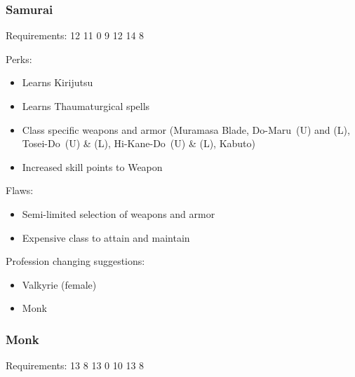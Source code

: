 \documentclass[12pt]{article}
\providecommand{\tightlist}{%
  \setlength{\itemsep}{0pt}\setlength{\parskip}{0pt}}
\newcommand{\WviiTwoColumnSetup}{\raggedcolumns\RaggedRight}
\begin{document}
\subsubsection{Samurai}\label{samurai}

Requirements: 12 11 0 9 12 14 8

\begin{multicols}{2}\WviiTwoColumnSetup
Perks:

\begin{itemize}
\item
  Learns Kirijutsu
\item
  Learns Thaumaturgical spells
\item
  Class specific weapons and armor (Muramasa Blade, Do-Maru~(U) and (L),
  Tosei-Do~(U) \& (L), Hi-Kane-Do~(U) \& (L), Kabuto)
\item
  Increased skill points to Weapon
\end{itemize}
\columnbreak

Flaws:

\begin{itemize}
\item
  Semi-limited selection of weapons and armor
\item
  Expensive class to attain and maintain
\end{itemize}
\end{multicols}

Profession changing suggestions:

\begin{itemize}
\tightlist
\item
  Valkyrie (female)
\item
  Monk
\end{itemize}

\subsubsection{Monk}\label{monk}

Requirements: 13 8 13 0 10 13 8
\end{document}
